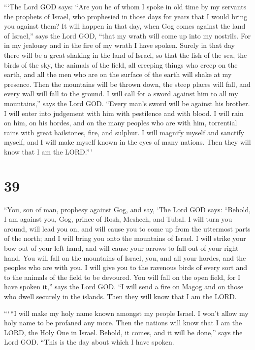  ```The Lord GOD says: ``Are you he of whom I spoke in old
time by my servants the prophets of Israel, who prophesied in those days
for years that I would bring you against them?  It will
happen in that day, when Gog comes against the land of Israel,'' says
the Lord GOD, ``that my wrath will come up into my nostrils.
 For in my jealousy and in the fire of my wrath I have
spoken. Surely in that day there will be a great shaking in the land of
Israel,  so that the fish of the sea, the birds of the sky,
the animals of the field, all creeping things who creep on the earth,
and all the men who are on the surface of the earth will shake at my
presence. Then the mountains will be thrown down, the steep places will
fall, and every wall will fall to the ground.  I will call
for a sword against him to all my mountains,'' says the Lord GOD.
``Every man's sword will be against his brother.  I will
enter into judgement with him with pestilence and with blood. I will
rain on him, on his hordes, and on the many peoples who are with him,
torrential rains with great hailstones, fire, and sulphur. 
I will magnify myself and sanctify myself, and I will make myself known
in the eyes of many nations. Then they will know that I am the
LORD.''\,'

\hypertarget{section-37}{%
\section{39}\label{section-37}}

 ``You, son of man, prophesy against Gog, and say, `The Lord
GOD says: ``Behold, I am against you, Gog, prince of Rosh, Meshech, and
Tubal.  I will turn you around, will lead you on, and will
cause you to come up from the uttermost parts of the north; and I will
bring you onto the mountains of Israel.  I will strike your
bow out of your left hand, and will cause your arrows to fall out of
your right hand.  You will fall on the mountains of Israel,
you, and all your hordes, and the peoples who are with you. I will give
you to the ravenous birds of every sort and to the animals of the field
to be devoured.  You will fall on the open field, for I have
spoken it,'' says the Lord GOD.  ``I will send a fire on
Magog and on those who dwell securely in the islands. Then they will
know that I am the LORD.

 ```\,``I will make my holy name known amongst my people
Israel. I won't allow my holy name to be profaned any more. Then the
nations will know that I am the LORD, the Holy One in Israel.
 Behold, it comes, and it will be done,'' says the Lord GOD.
``This is the day about which I have spoken.

